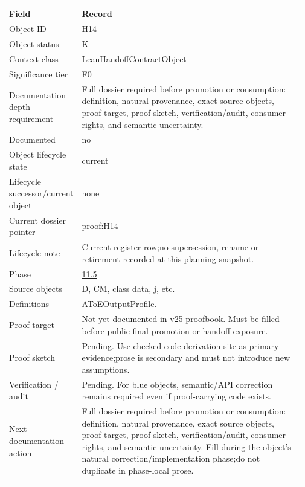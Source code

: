 \begin{longtable}{L{0.16\linewidth} L{0.81\linewidth}}
\hline
\textbf{Field} & \textbf{Record}\\
\hline
Object ID & \hyperlink{object-row-H14}{H14}\\
\hline\addlinespace[0.20em]
Object status & K\\
\hline\addlinespace[0.20em]
Context class & LeanHandoffContractObject\\
\hline\addlinespace[0.20em]
Significance tier & F0\\
\hline\addlinespace[0.20em]
Documentation depth requirement & Full dossier required before promotion or consumption: definition, natural provenance, exact source objects, proof target, proof sketch, verification/\allowbreak{}audit, consumer rights, and semantic uncertainty.\\
\hline\addlinespace[0.20em]
Documented & no\\
\hline\addlinespace[0.20em]
Object lifecycle state & current\\
\hline\addlinespace[0.20em]
Lifecycle successor/\allowbreak{}current object & none\\
\hline\addlinespace[0.20em]
Current dossier pointer & proof:H14\\
\hline\addlinespace[0.20em]
Lifecycle note & Current register row;\newline no supersession, rename or retirement recorded at this planning snapshot.\\
\hline\addlinespace[0.20em]
Phase & \hyperlink{phase-row-11-5}{11.5}\\
\hline\addlinespace[0.20em]
Source objects & D, CM, class data, j, etc.\\
\hline\addlinespace[0.20em]
Definitions & AToEOutputProfile.\\
\hline\addlinespace[0.20em]
Proof target & Not yet documented in v25 proofbook. Must be filled before public-final promotion or handoff exposure.\\
\hline\addlinespace[0.20em]
Proof sketch & Pending. Use checked code derivation site as primary evidence;\newline prose is secondary and must not introduce new assumptions.\\
\hline\addlinespace[0.20em]
Verification /\allowbreak{} audit & Pending. For blue objects, semantic/\allowbreak{}API correction remains required even if proof-carrying code exists.\\
\hline\addlinespace[0.20em]
Next documentation action & Full dossier required before promotion or consumption: definition, natural provenance, exact source objects, proof target, proof sketch, verification/\allowbreak{}audit, consumer rights, and semantic uncertainty. Fill during the object's natural correction/\allowbreak{}implementation phase;\newline do not duplicate in phase-local prose.\\
\hline\addlinespace[0.20em]
\end{longtable}
